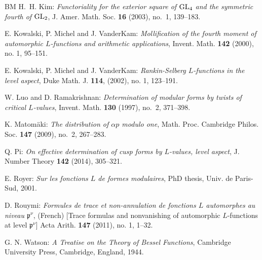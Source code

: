 \documentclass[12pt]{amsart}
\theoremstyle{plain}
\theoremstyle{definition}
\begin{document}
\begin{thebibliography}{BM}
H.~H. Kim: \emph{Functoriality for the exterior square of ${\rm GL}_4$ and the symmetric fourth of ${\rm GL}_2$}, J. Amer. Math. Soc. {\bf 16} (2003), no.~1, 139--183. 

E. Kowalski, P. Michel and J. VanderKam: \emph{Mollification of the fourth moment of automorphic $L$-functions and arithmetic applications}, Invent. Math. {\bf 142} (2000), no. 1, 95--151. 

E. Kowalski, P. Michel and J. VanderKam: \emph{Rankin-Selberg $L$-functions in the level aspect}, Duke Math. J. {\bf 114}, (2002), no. 1, 123--191.

W. Luo and D. Ramakrishnan: \emph{Determination of modular forms by twists of critical $L$-values}, Invent. Math. {\bf 130} (1997), no.~2, 371--398.

K. Matom\"{a}ki: \emph{The distribution of $\alpha p$ modulo one}, Math. Proc. Cambridge Philos. Soc. {\bf 147} (2009), no.~2, 267--283. 



Q. Pi: \emph{On effective determination of cusp forms by $L$-values, level aspect}, J. Number Theory {\bf 142} (2014), 305--321.

E. Royer: \emph{Sur les fonctions $L$ de formes modulaires}, PhD thesis, Univ. de Paris-Sud, 2001.


D. Rouymi: \emph{Formules de trace et non-annulation de fonctions $L$ automorphes au niveau $\mathfrak{p}^\nu$}, (French) [Trace formulas and nonvanishing of automorphic $L$-functions at level $\mathfrak{p}^{\nu}$] Acta Arith. {\bf 147} (2011), no. 1, 1--32. 


G. N. Watson: \emph{A Treatise on the Theory of Bessel Functions}, Cambridge University Press, Cambridge, England, 1944.


\end{thebibliography}
\end{document}
